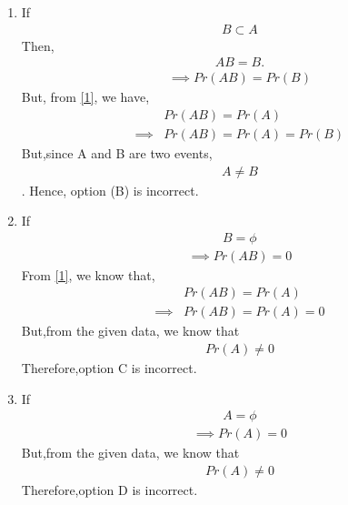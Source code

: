 \begin{enumerate}[label={\Alph*)}]
\item If 
\begin{align}
  B \subset A  
\end{align}
Then, 
\begin{align}
AB=B.
\end{align}
\begin{align}
\implies Pr(AB)=Pr(B)
\end{align}
But, from \eqref{1}, we have, 
\begin{align}
&Pr(AB)=Pr(A)\\
\implies &Pr(AB)=Pr(A)=Pr(B)
\end{align}
But,since A and B are two events, 
\begin{align}
    A\neq B
\end{align}. Hence, option (B) is incorrect.
 \item If 
 \begin{align}
     B=\phi
 \end{align}
\begin{align}
\implies Pr(AB)=0
\end{align}From \eqref{1}, we know that,
\begin{align}
& Pr(AB)=Pr(A)\\
\implies & Pr(AB)=Pr(A)=0
\end{align}
But,from the given data, we know that 
\begin{align}
     Pr(A) \neq 0
 \end{align}
Therefore,option C is incorrect.
\item If 
\begin{align}
     A=\phi
 \end{align}
\begin{align}
\implies Pr(A)=0
\end{align}
But,from the given data, we know that 
\begin{align}
     Pr(A) \neq 0
 \end{align}
Therefore,option D is incorrect.
\end{enumerate}